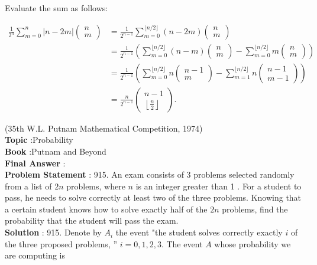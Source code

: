\documentclass[10pt]{article}
\begin{document}
Evaluate the sum as follows:

$$
\begin{aligned}
\frac{1}{2^{n}} \sum_{m=0}^{n}|n-2 m|\left(\begin{array}{c}
n \\
m
\end{array}\right) &=\frac{1}{2^{n-1}} \sum_{m=0}^{\lfloor n / 2\rfloor}(n-2 m)\left(\begin{array}{c}
n \\
m
\end{array}\right) \\
&=\frac{1}{2^{n-1}}\left(\sum_{m=0}^{\lfloor n / 2\rfloor}(n-m)\left(\begin{array}{c}
n \\
m
\end{array}\right)-\sum_{m=0}^{\lfloor n / 2\rfloor} m\left(\begin{array}{c}
n \\
m
\end{array}\right)\right) \\
&=\frac{1}{2^{n-1}}\left(\sum_{m=0}^{\lfloor n / 2\rfloor} n\left(\begin{array}{c}
n-1 \\
m
\end{array}\right)-\sum_{m=1}^{\lfloor n / 2\rfloor} n\left(\begin{array}{c}
n-1 \\
m-1
\end{array}\right)\right) \\
&=\frac{n}{2^{n-1}}\left(\begin{array}{c}
n-1 \\
\left\lfloor\frac{n}{2}\right\rfloor
\end{array}\right) .
\end{aligned}
$$

(35th W.L. Putnam Mathematical Competition, 1974)
\\
\textbf{Topic} :Probability\\
\textbf{Book} :Putnam and Beyond\\
\textbf{Final Answer} :\\


\textbf{Problem Statement} :
915. An exam consists of 3 problems selected randomly from a list of $2 n$ problems, where $n$ is an integer greater than 1 . For a student to pass, he needs to solve correctly at least two of the three problems. Knowing that a certain student knows how to solve exactly half of the $2 n$ problems, find the probability that the student will pass the exam.
\\
\textbf{Solution} :
915. Denote by $A_{i}$ the event "the student solves correctly exactly $i$ of the three proposed problems, '' $i=0,1,2,3$. The event $A$ whose probability we are computing is
\end{document}
